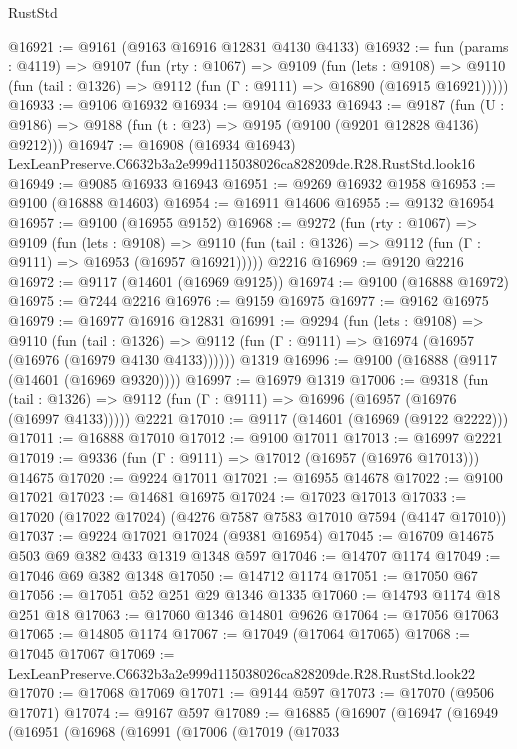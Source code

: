 \begin{lexlean}{RustStd}
\begin{coremodule}
@16921 := @9161 (@9163 @16916 @12831 @4130 @4133)
@16932 := fun (params : @4119) =>
  @9107
    (fun (rty : @1067) =>
    @9109
      (fun (lets : @9108) =>
      @9110 (fun (tail : @1326) => @9112 (fun (Γ : @9111) => @16890 (@16915 @16921)))))
@16933 := @9106 @16932
@16934 := @9104 @16933
@16943 := @9187
    (fun (U : @9186) => @9188 (fun (t : @23) => @9195 (@9100 (@9201 @12828 @4136) @9212)))
@16947 := @16908
    (@16934 @16943)
    LexLeanPreserve.C6632b3a2e999d115038026ca828209de.R28.RustStd.look16
@16949 := @9085 @16933 @16943
@16951 := @9269 @16932 @1958
@16953 := @9100 (@16888 @14603)
@16954 := @16911 @14606
@16955 := @9132 @16954
@16957 := @9100 (@16955 @9152)
@16968 := @9272
    (fun (rty : @1067) =>
    @9109
      (fun (lets : @9108) =>
      @9110 (fun (tail : @1326) => @9112 (fun (Γ : @9111) => @16953 (@16957 @16921)))))
    @2216
@16969 := @9120 @2216
@16972 := @9117 (@14601 (@16969 @9125))
@16974 := @9100 (@16888 @16972)
@16975 := @7244 @2216
@16976 := @9159 @16975
@16977 := @9162 @16975
@16979 := @16977 @16916 @12831
@16991 := @9294
    (fun (lets : @9108) =>
    @9110
      (fun (tail : @1326) =>
      @9112 (fun (Γ : @9111) => @16974 (@16957 (@16976 (@16979 @4130 @4133))))))
    @1319
@16996 := @9100 (@16888 (@9117 (@14601 (@16969 @9320))))
@16997 := @16979 @1319
@17006 := @9318
    (fun (tail : @1326) => @9112 (fun (Γ : @9111) => @16996 (@16957 (@16976 (@16997 @4133)))))
    @2221
@17010 := @9117 (@14601 (@16969 (@9122 @2222)))
@17011 := @16888 @17010
@17012 := @9100 @17011
@17013 := @16997 @2221
@17019 := @9336 (fun (Γ : @9111) => @17012 (@16957 (@16976 @17013))) @14675
@17020 := @9224 @17011
@17021 := @16955 @14678
@17022 := @9100 @17021
@17023 := @14681 @16975
@17024 := @17023 @17013
@17033 := @17020 (@17022 @17024) (@4276 @7587 @7583 @17010 @7594 (@4147 @17010))
@17037 := @9224 @17021 @17024 (@9381 @16954)
@17045 := @16709 @14675 @503 @69 @382 @433 @1319 @1348 @597
@17046 := @14707 @1174
@17049 := @17046 @69 @382 @1348
@17050 := @14712 @1174
@17051 := @17050 @67
@17056 := @17051 @52 @251 @29 @1346 @1335
@17060 := @14793 @1174 @18 @251 @18
@17063 := @17060 @1346 @14801 @9626
@17064 := @17056 @17063
@17065 := @14805 @1174
@17067 := @17049 (@17064 @17065)
@17068 := @17045 @17067
@17069 := LexLeanPreserve.C6632b3a2e999d115038026ca828209de.R28.RustStd.look22
@17070 := @17068 @17069
@17071 := @9144 @597
@17073 := @17070 (@9506 @17071)
@17074 := @9167 @597
@17089 := @16885
    (@16907
      (@16947
        (@16949
          (@16951
            (@16968
              (@16991
                (@17006
                  (@17019
                    (@17033

\end{coremodule}
\end{lexlean}
